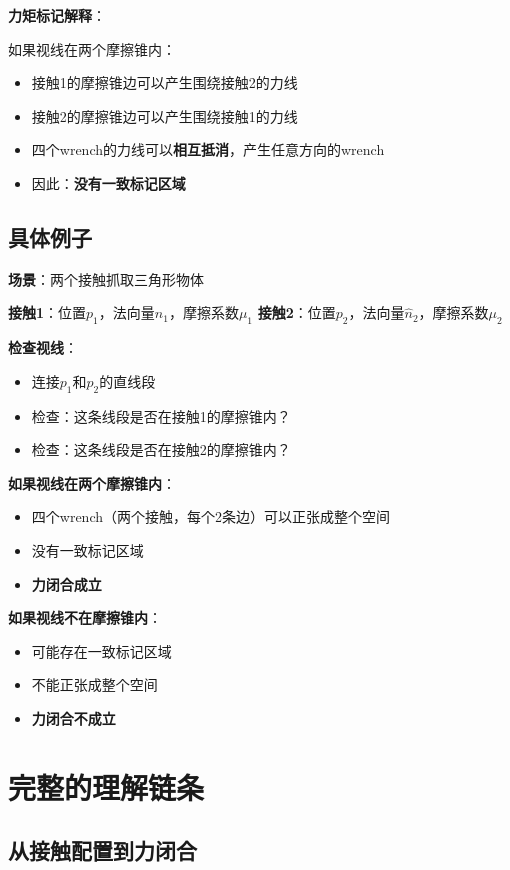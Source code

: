 \documentclass[12pt,a4paper]{article}
\begin{document}
\textbf{力矩标记解释}：

如果视线在两个摩擦锥内：
\begin{itemize}
\item 接触1的摩擦锥边可以产生围绕接触2的力线
\item 接触2的摩擦锥边可以产生围绕接触1的力线
\item 四个wrench的力线可以\textbf{相互抵消}，产生任意方向的wrench
\item 因此：\textbf{没有一致标记区域}
\end{itemize}

\subsection{具体例子}

\textbf{场景}：两个接触抓取三角形物体

\textbf{接触1}：位置$p_1$，法向量$\hat{n}_1$，摩擦系数$\mu_1$
\textbf{接触2}：位置$p_2$，法向量$\hat{n}_2$，摩擦系数$\mu_2$

\textbf{检查视线}：
\begin{itemize}
\item 连接$p_1$和$p_2$的直线段
\item 检查：这条线段是否在接触1的摩擦锥内？
\item 检查：这条线段是否在接触2的摩擦锥内？
\end{itemize}

\textbf{如果视线在两个摩擦锥内}：
\begin{itemize}
\item 四个wrench（两个接触，每个2条边）可以正张成整个空间
\item 没有一致标记区域
\item \textbf{力闭合成立}
\end{itemize}

\textbf{如果视线不在摩擦锥内}：
\begin{itemize}
\item 可能存在一致标记区域
\item 不能正张成整个空间
\item \textbf{力闭合不成立}
\end{itemize}

\section{完整的理解链条}

\subsection{从接触配置到力闭合}
\end{document}

